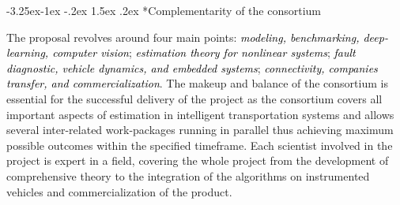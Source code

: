 \documentclass[a4paper,11pt]{article}
\makeatletter
\newcounter {subsubsubsection}[subsubsection]
\newcommand\subsubsubsection{\@startsection{subsubsubsection}{4}{\z@}%
                                     {-3.25ex\@plus -1ex \@minus -.2ex}%
                                     {1.5ex \@plus .2ex}%
                                     {\normalfont\normalsize\bfseries}}
\makeatother
\begin{document}
\subsubsubsection*{Complementarity of the consortium}

The proposal revolves around four main points: \textcolor{black}{\it modeling, benchmarking, deep-learning, computer vision}; \textcolor{black}{\it estimation theory for nonlinear systems}; \textcolor{black}{\it fault diagnostic, vehicle dynamics, and embedded  systems}; \textcolor{black}{\it connectivity, companies transfer, and commercialization}.
%
{The makeup and balance of the consortium is essential for the successful delivery of the project as the consortium covers all important aspects of estimation in intelligent transportation systems and allows several inter-related work-packages running in parallel thus achieving maximum possible outcomes within the specified timeframe.}
%
Each scientist involved in the project is expert in a field, covering the whole project from the development of comprehensive theory to the integration of the algorithms on instrumented vehicles and commercialization of the product. %
%
\end{document}
